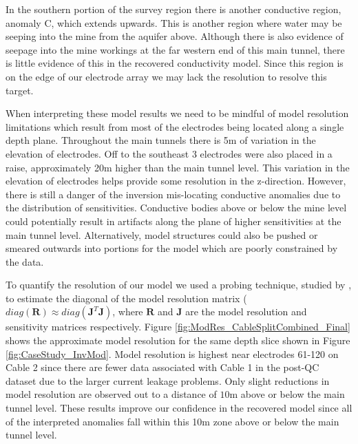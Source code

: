 \documentclass[final,authoryear,5p,times,twocolumn]{elsarticle}
\begin{document}
In the southern portion of the survey region there is another conductive region, anomaly C, which extends upwards. This is another region where water may be seeping into the mine from the aquifer above. Although there is also evidence of seepage into the mine workings at the far western end of this main tunnel, there is little evidence of this in the recovered conductivity model. Since this region is on the edge of our electrode array we may lack the resolution to resolve this target.

When interpreting these model results we need to be mindful of model resolution limitations which result from most of the electrodes being located along a single depth plane. Throughout the main tunnels there is 5m of variation in the elevation of electrodes. Off to the southeast 3 electrodes were also placed in a raise, approximately 20m higher than the main tunnel level. This variation in the elevation of electrodes helps provide some resolution in the z-direction. However, there is still a danger of the inversion mis-locating conductive anomalies due to the distribution of sensitivities. Conductive bodies above or below the mine level could potentially result in artifacts along the plane of higher sensitivities at the main tunnel level. Alternatively, model structures could also be pushed or smeared outwards into portions for the model which are poorly constrained by the data.   

To quantify the resolution of our model we used a probing technique, studied by \cite{Bekas2007}, to estimate the diagonal of the model resolution matrix ($diag(\mathbf{R}) \approx diag(\mathbf{J}^{T}\mathbf{J})$, where $\mathbf{R}$ and $\mathbf{J}$ are the model resolution and sensitivity matrices respectively. Figure \ref{fig:ModRes_CableSplitCombined_Final} shows the approximate model resolution for the same depth slice shown in Figure \ref{fig:CaseStudy_InvMod}. Model resolution is highest near electrodes 61-120 on Cable 2 since there are fewer data associated with Cable 1 in the post-QC dataset due to the larger current leakage problems. Only slight reductions in model resolution are observed out to a distance of $10$m above or below the main tunnel level. These results improve our confidence in the recovered model since all of the interpreted anomalies fall within this 10m zone above or below the main tunnel level.
\end{document}
